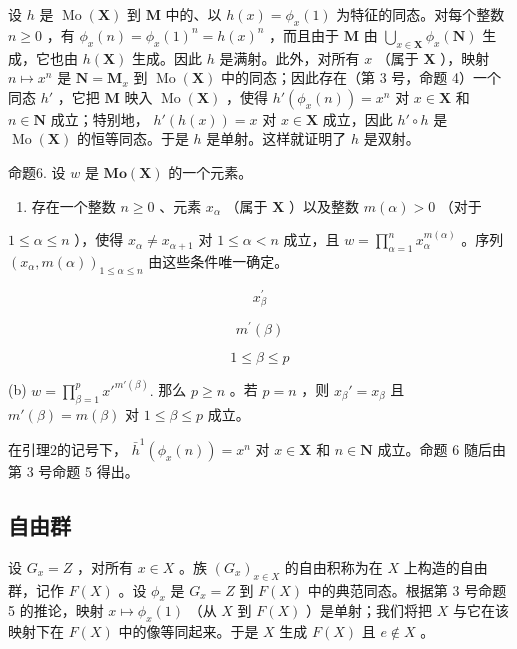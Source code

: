 设 \(h\) 是 \(\operatorname{Mo}(\mathbf{X})\) 到 \(\mathbf{M}\) 中的、以 \(h(x) = \phi_x(1)\) 为特征的同态。对每个整数 \(n \geqslant 0\) ，有 \(\phi_x(n) = \phi_x(1)^n = h(x)^n\) ，而且由于 \(\mathbf{M}\) 由 \(\bigcup_{x \in \mathbf{X}} \phi_x(\mathbf{N})\) 生成，它也由 \(h(\mathbf{X})\) 生成。因此 \(h\) 是满射。此外，对所有 \(x\) （属于 \(\mathbf{X}\) ），映射 \(n \mapsto x^n\) 是 \(\mathbf{N} = \mathbf{M}_x\) 到 \(\operatorname{Mo}(\mathbf{X})\) 中的同态；因此存在（第 3 号，命题 4）一个同态 \(h'\) ，它把 \(\mathbf{M}\) 映入 \(\operatorname{Mo}(\mathbf{X})\) ，使得 \(h'(\phi_x(n)) = x^n\) 对 \(x \in \mathbf{X}\) 和 \(n \in \mathbf{N}\) 成立；特别地， \(h'(h(x)) = x\) 对 \(x \in \mathbf{X}\) 成立，因此 \(h' \circ h\) 是 \(\operatorname{Mo}(\mathbf{X})\) 的恒等同态。于是 \(h\) 是单射。这样就证明了 \(h\) 是双射。

命题6. 设 \(w\) 是 \(\mathbf{Mo}(\mathbf{X})\) 的一个元素。

\begin{enumerate}
\def\labelenumi{(\alph{enumi})}
\tightlist
\item
  存在一个整数 \(n \geqslant 0\) 、元素 \(x_{\alpha}\) （属于 \(\mathbf{X}\) ）以及整数 \(m(\alpha) > 0\) （对于
\end{enumerate}

\(1 \leqslant \alpha \leqslant n\) ），使得 \(x_{\alpha} \neq x_{\alpha + 1}\) 对 \(1 \leqslant \alpha < n\) 成立，且 \(w = \prod_{\alpha = 1}^{n} x_{\alpha}^{m(\alpha)}\) 。序列 \((x_{\alpha}, m(\alpha))_{1 \leqslant \alpha \leqslant n}\) 由这些条件唯一确定。

\[
x _ {\beta} ^ {\prime}
\]

\[
m ^ {\prime} (\beta)
\]

\[
1 \leqslant \beta \leqslant p
\]

(b) \(w = \prod_{\beta=1}^{p} x'^{m'(\beta)}.\) 那么 \(p \geqslant n\) 。若 \(p = n\) ，则 \(x_{\beta}' = x_{\beta}\) 且 \(m'(\beta) = m(\beta)\) 对 \(1 \leqslant \beta \leqslant p\) 成立。

在引理2的记号下， \(\bar{h}^{1}(\phi_x(n)) = x^n\) 对 \(x \in \mathbf{X}\) 和 \(n \in \mathbf{N}\) 成立。命题 6 随后由第 3 号命题 5 得出。

\subsection{自由群}

设 \(G_x = Z\) ，对所有 \(x \in X\) 。族 \((G_x)_{x \in X}\) 的自由积称为在 \(X\) 上构造的自由群，记作 \(F(X)\) 。设 \(\phi_x\) 是 \(G_x = Z\) 到 \(F(X)\) 中的典范同态。根据第 3 号命题 5 的推论，映射 \(x \mapsto \phi_x(1)\) （从 \(X\) 到 \(F(X)\) ）是单射；我们将把 \(X\) 与它在该映射下在 \(F(X)\) 中的像等同起来。于是 \(X\) 生成 \(F(X)\) 且 \(e \notin X\) 。

